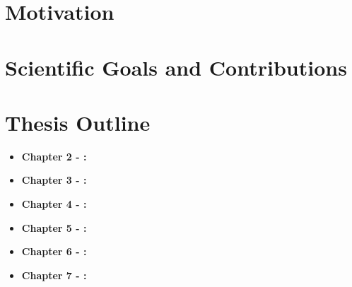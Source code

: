 \section{Motivation} \label{sec:Chapter1-2} 
\cite{}
\cite{}
\cite{}
\cite{}
\cite{}
\cite{}
\cite{}
\cite{}
\cite{}
\cite{}

\section{Scientific Goals and Contributions} \label{sec:Chapter1-3} 

\section{Thesis Outline} \label{sec:Chapter1-4} 

    \begin{itemize}
        \item \textbf{Chapter 2 - {\hypersetup{hidelinks}}:}
        \item \textbf{Chapter 3 - {\hypersetup{hidelinks}}:}
        \item \textbf{Chapter 4 - {\hypersetup{hidelinks}}:}                %
        \item \textbf{Chapter 5 - {\hypersetup{hidelinks}}:}       %
        \item \textbf{Chapter 6 - {\hypersetup{hidelinks}}:}
        \item \textbf{Chapter 7 - {\hypersetup{hidelinks}}:}
    \end{itemize}
